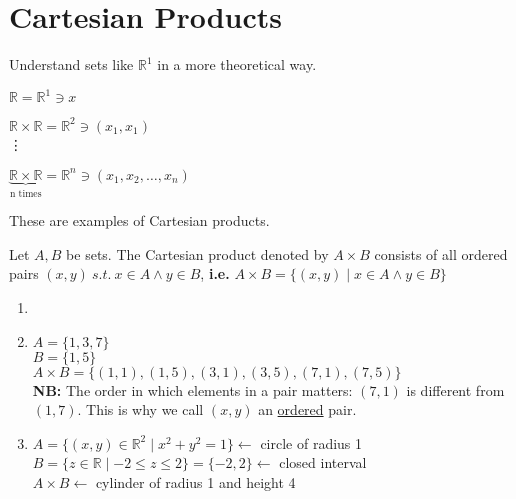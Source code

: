 \documentclass[10pt]{article}
\begin{document}
	\section{Cartesian Products}
	\begin{description}
		\item[Task:] Understand sets like $\mathbb{R}^1$ in a more theoretical way.
		\item[Recall from Calculus:]
		\item $\mathbb{R} = \mathbb{R}^1 \ni x$
		\item $\mathbb{R} \times \mathbb{R} = \mathbb{R}^2 \ni (x_1, x_1)$ \\ \vdots
		\item $\underbrace{\mathbb{R} \times \mathbb{R}}_{\text{n times}} = \mathbb{R}^n \ni (x_1, x_2, \dots, x_n)$
		\item These are examples of Cartesian products.
		\item[Definition:] Let $A, B$ be sets. The Cartesian product denoted by $A \times B$ consists of all ordered pairs $(x, y) \: s.t. \: x \in A \land y \in B$, \textbf{i.e.} $A \times B = \{(x, y) \mid x \in A \land y \in B \}$
		\item[Further Examples:]
		\begin{enumerate}
			\item[]
			\item $A = \{1, 3, 7\}$ \\
			$B = \{1, 5\}$ \\
			$A \times B = \{(1, 1), (1, 5), (3, 1), (3, 5), (7, 1), (7, 5)\}$ \\
			\textbf{NB:} The order in which elements in a pair matters: $(7, 1)$ is different from $(1, 7)$. This is why we call $(x, y)$ an \underline{ordered} pair.
			\item $A = \{(x, y) \in \mathbb{R}^2 \mid x^2 + y^2 = 1 \} \leftarrow$ circle of radius 1 \\
			$B = \{z \in \mathbb{R} \mid -2 \leq z \leq 2 \} = \{-2, 2\} \leftarrow$ closed interval \\
			$A \times B \leftarrow$ cylinder of radius 1 and height 4
		\end{enumerate}
	\end{description}
	
\end{document}
